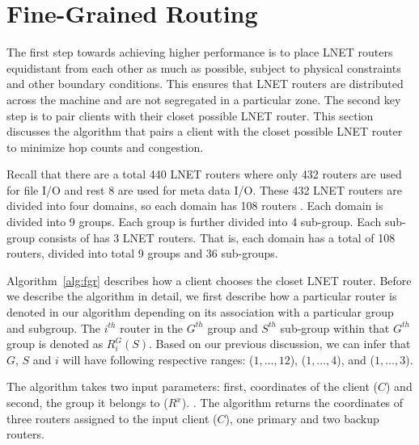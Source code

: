 \section{Fine-Grained Routing}


The first step towards achieving higher performance is to place LNET routers equidistant from each other as much as possible,
subject to physical constraints and other boundary conditions. This ensures that LNET routers are distributed across the machine
and are not segregated in a particular zone. The second key step is to pair clients with their closet possible LNET router. This 
section discusses the algorithm that pairs a client with the closet possible LNET router to minimize hop counts and congestion.

Recall that there are a total 440 LNET routers where only 432 routers are used for file I/O and rest 8 are used for meta data I/O.
These 432 LNET routers are divided into four domains, so each domain has 108 routers . Each
domain is divided into 9 groups. Each group is further divided into 4 sub-group. Each sub-group consists of has 3 LNET routers. That 
is, each domain has a total of 108 routers, divided into total 9 groups and 36 sub-groups.


Algorithm~\ref{alg:fgr} describes how a client chooses the closet LNET router. Before we describe the algorithm in detail, we first
describe how a particular router is denoted in our algorithm depending on its association with a particular group and subgroup. The 
$i^{th}$ router in the $G^{th}$ group and $S^{th}$ sub-group within that $G^{th}$ group is denoted as $R^G_{i}(S)$. Based on 
our previous discussion, we can infer that $G$, $S$ and $i$ will have following respective ranges: ($1, \dots, 12$), ($1, \dots, 4$), 
and ($1, \dots, 3$).

The algorithm takes two input parameters: first, coordinates of the client ($C$) and second, the group it belongs to ($R^x$). . The algorithm returns the coordinates of three routers assigned to the input client ($C$),
one primary and two backup routers.


